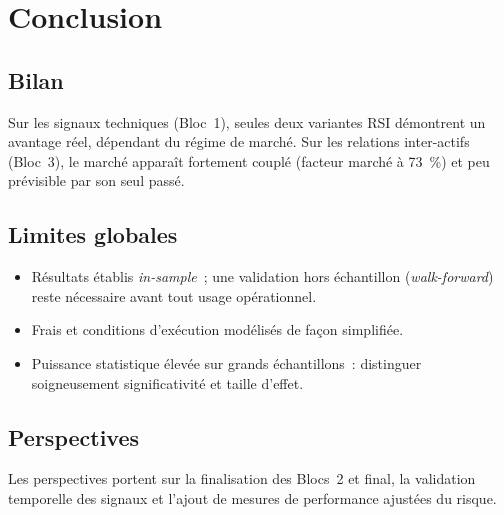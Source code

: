 \chapter{Conclusion}
\label{chap:conclusion}

\section{Bilan}
Sur les signaux techniques (Bloc~1), seules deux variantes RSI démontrent
un avantage réel, dépendant du régime de marché. Sur les relations
inter-actifs (Bloc~3), le marché apparaît fortement couplé (facteur
marché à 73~\%) et peu prévisible par son seul passé.

\section{Limites globales}
\begin{limites}
\begin{itemize}
  \item Résultats établis \emph{in-sample}~; une validation hors
        échantillon (\emph{walk-forward}) reste nécessaire avant tout
        usage opérationnel.
  \item Frais et conditions d'exécution modélisés de façon simplifiée.
  \item Puissance statistique élevée sur grands échantillons~: distinguer
        soigneusement significativité et taille d'effet.
\end{itemize}
\end{limites}

\section{Perspectives}
Les perspectives portent sur la finalisation des Blocs~2 et final, la
validation temporelle des signaux et l'ajout de mesures de performance
ajustées du risque.
